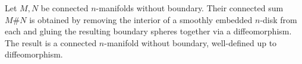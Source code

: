 Let $M, N$ be connected $n$-manifolds without boundary. Their connected sum $M \# N$ is obtained by removing the interior of a smoothly embedded $n$-disk from each and gluing the resulting boundary spheres together via a diffeomorphism. The result is a connected $n$-manifold without boundary, well-defined up to diffeomorphism.
